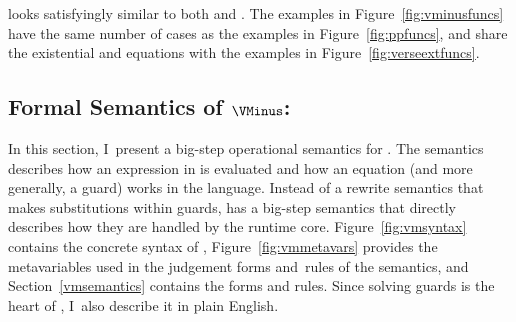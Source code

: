 \documentclass[manuscript,screen,review, 12pt, nonacm]{acmart}
\begin{document}
    \VMinus looks satisfyingly similar to both \PPlus and \VC. The \VMinus
    examples in Figure~\ref{fig:vminusfuncs} have the same number of cases as
    the \PPlus examples in Figure~\ref{fig:ppfuncs}, and share the existential
    and equations with the \VC examples in Figure~\ref{fig:verseextfuncs}. 
   




\subsection{Formal Semantics of $\VMinus$:}
    In this section, I~present a big-step operational semantics for \VMinus. The
    semantics describes how an expression in \VMinus is evaluated and how an
    equation (and more generally, a guard) works in the language. Instead of a
    rewrite semantics that makes substitutions within guards, \VMinus has a
    big-step semantics that directly describes how they are handled by the
    runtime core. Figure~\ref{fig:vmsyntax} contains the concrete syntax of
    \VMinus, Figure~\ref{fig:vmmetavars} provides the metavariables used in the
    judgement forms and~rules of the semantics, and Section~\ref{vmsemantics}
    contains the forms and rules. Since solving guards is the heart of \VMinus,
    I~also describe it in plain English.
\end{document}
